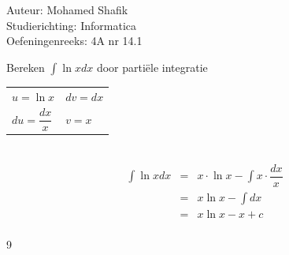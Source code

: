 \documentclass[a4paper]{article}
\begin{document}
\noindent \large Auteur: Mohamed Shafik \\
\noindent \large Studierichting: Informatica\\
\noindent \large Oefeningenreeks: 4A nr 14.1\\

\medskip

\normalsize

Bereken $\displaystyle\int \ln x  dx$ door parti\"ele integratie\\

\begin{tabular}{ll}
$u = \ln x$ & $dv = dx$\\
$du = \dfrac{dx}{x}$ & $v = x$\\
\end{tabular}\\

\begin{eqnarray*}
\displaystyle\int \ln x  dx &=& x \cdot \ln x - \displaystyle\int x \cdot \dfrac{dx}{x}\\
&=& x \ln x - \displaystyle\int dx\\
&=& x \ln x - x + c\\
\end{eqnarray*}

\begin{thebibliography}{9}
\end{thebibliography}
\end{document}
